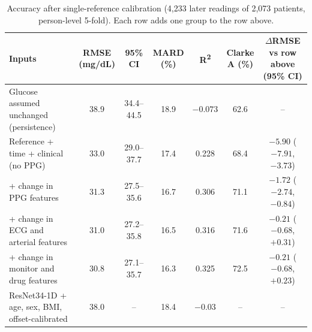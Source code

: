 \documentclass[11pt]{article}
\newcommand{\RR}{R\textsuperscript{2}}
\newcommand{\mgdl}{mg/dL}
\begin{document}
\begin{table}[!htbp]
\centering\footnotesize\setlength{\tabcolsep}{3.2pt}
\begin{threeparttable}
\caption{Accuracy after single-reference calibration (4,233 later readings of 2,073 patients, person-level 5-fold). Each row adds one group to the row above.}
\label{tab:calib}
\begin{tabular}{@{}lcccccc@{}}
\toprule
Inputs & \makecell{RMSE\\(\mgdl{})} & 95\% CI & \makecell{MARD\\(\%)} & \RR{} & \makecell{Clarke\\A (\%)} & \makecell{$\Delta$RMSE vs row above\\(95\% CI)} \\
\midrule
Glucose assumed unchanged (persistence) & 38.9 & 34.4--44.5 & 18.9 & $-0.073$ & 62.6 & -- \\
Reference + time + clinical (no PPG) & 33.0 & 29.0--37.7 & 17.4 & 0.228 & 68.4 & $-5.90$ ($-7.91$, $-3.73$) \\
\rowcolor{rowgray} + change in PPG features & 31.3 & 27.5--35.6 & 16.7 & 0.306 & 71.1 & $-1.72$ ($-2.74$, $-0.84$) \\
+ change in ECG and arterial features & 31.0 & 27.2--35.8 & 16.5 & 0.316 & 71.6 & $-0.21$ ($-0.68$, $+0.31$) \\
+ change in monitor and drug features & 30.8 & 27.1--35.7 & 16.3 & 0.325 & 72.5 & $-0.21$ ($-0.68$, $+0.23$) \\
\midrule
ResNet34-1D + age, sex, BMI, offset-calibrated & 38.0 & -- & 18.4 & $-0.03$ & -- & -- \\
\bottomrule
\end{tabular}
\end{threeparttable}
\end{table}
\end{document}
